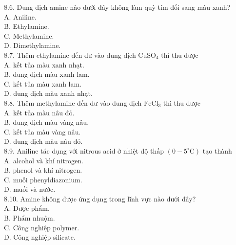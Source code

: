 \documentclass[10pt]{article}
\begin{document}
8.6. Dung dịch amine nào dưới đây không làm quỳ tím đổi sang màu xanh?\\
A. Aniline.\\
B. Ethylamine.\\
C. Methylamine.\\
D. Dimethylamine.\\
8.7. Thêm ethylamine đến dư vào dung dịch $\mathrm{CuSO}_{4}$ thì thu được\\
A. kết tủa màu xanh nhạt.\\
B. dung dịch màu xanh lam.\\
C. kết tủa màu xanh lam.\\
D. dung dịch màu xanh nhạt.\\
8.8. Thêm methylamine đến dư vào dung dịch $\mathrm{FeCl}_{3}$ thì thu được\\
A. kết tủa màu nâu đỏ.\\
B. dung dịch màu vàng nâu.\\
C. kết tủa màu vàng nâu.\\
D. dung dịch màu nâu đỏ.\\
8.9. Aniline tác dụng với nitrous acid ở nhiệt độ thấp $\left(0-5^{\circ} \mathrm{C}\right)$ tạo thành\\
A. alcohol và khí nitrogen.\\
B. phenol và khí nitrogen.\\
C. muối phenyldiazonium.\\
D. muối và nước.\\
8.10. Amine không được ứng dụng trong lĩnh vực nào dưới đây?\\
A. Dược phẩm.\\
B. Phẩm nhuộm.\\
C. Công nghiệp polymer.\\
D. Công nghiệp silicate.
\end{document}
